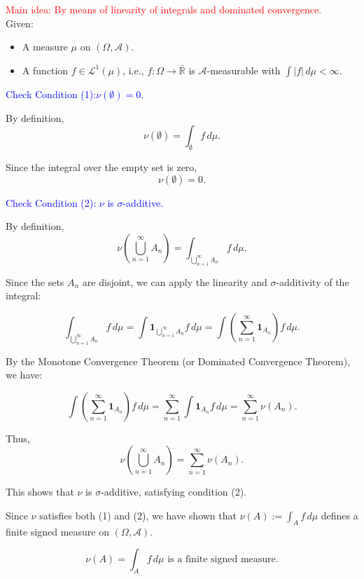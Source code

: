 \documentclass{report}
\begin{document}
\begin{myproof}
    \textcolor{red}{Main idea: By means of linearity of integrals and dominated convergence.}\\
Given:
\begin{itemize}
    \item A measure \(\mu\) on \((\Omega, \mathcal{A})\).
    \item A function \(f \in \mathcal{L}^1(\mu)\), i.e., \(f: \Omega \to \bar{\mathbb{R}}\) is \(\mathcal{A}\)-measurable with \(\int |f| \, d\mu < \infty\).
\end{itemize}

\textcolor{blue}{Check Condition (1):\(\nu(\emptyset) = 0\).}

By definition,
\[ \nu(\emptyset) = \int_\emptyset f \, d\mu. \]

Since the integral over the empty set is zero,
\[ \nu(\emptyset) = 0. \]

\textcolor{blue}{Check Condition (2): \(\nu\) is \(\sigma\)-additive.}

By definition,
\[ \nu\left(\bigcup_{n=1}^\infty A_n\right) = \int_{\bigcup_{n=1}^\infty A_n} f \, d\mu. \]

Since the sets \(A_n\) are disjoint, we can apply the linearity and \(\sigma\)-additivity of the integral:

\[ \int_{\bigcup_{n=1}^\infty A_n} f \, d\mu = \int \mathbf{1}_{\bigcup_{n=1}^\infty A_n} f \, d\mu = \int \left( \sum_{n=1}^\infty \mathbf{1}_{A_n} \right) f \, d\mu. \]

By the Monotone Convergence Theorem (or Dominated Convergence Theorem), we have:

\[ \int \left( \sum_{n=1}^\infty \mathbf{1}_{A_n} \right) f \, d\mu = \sum_{n=1}^\infty \int \mathbf{1}_{A_n} f \, d\mu = \sum_{n=1}^\infty \nu(A_n). \]

Thus,
\[ \nu\left(\bigcup_{n=1}^\infty A_n\right) = \sum_{n=1}^\infty \nu(A_n). \]

This shows that \(\nu\) is \(\sigma\)-additive, satisfying condition (2).

Since \(\nu\) satisfies both (1) and (2), we have shown that \(\nu(A) := \int_A f \, d\mu\) defines a finite signed measure on \((\Omega, \mathcal{A})\).

\[
\boxed{\nu(A) = \int_A f \, d\mu \text{ is a finite signed measure.}}
\]
\end{myproof}
\end{document}
